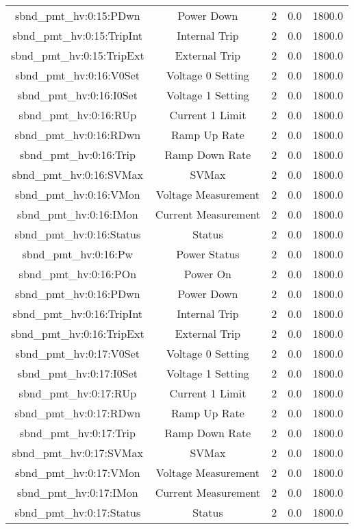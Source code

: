 \begin{table}[ptb]
\begin{tabular}{c | c c c c}
sbnd_pmt_hv:0:15:PDwn & Power Down & 2 & 0.0 & 1800.0\\ 
sbnd_pmt_hv:0:15:TripInt & Internal Trip & 2 & 0.0 & 1800.0\\ 
sbnd_pmt_hv:0:15:TripExt & External Trip & 2 & 0.0 & 1800.0\\ 
sbnd_pmt_hv:0:16:V0Set & Voltage 0 Setting & 2 & 0.0 & 1800.0\\ 
sbnd_pmt_hv:0:16:I0Set & Voltage 1 Setting & 2 & 0.0 & 1800.0\\ 
sbnd_pmt_hv:0:16:RUp & Current 1 Limit & 2 & 0.0 & 1800.0\\ 
sbnd_pmt_hv:0:16:RDwn & Ramp Up Rate & 2 & 0.0 & 1800.0\\ 
sbnd_pmt_hv:0:16:Trip & Ramp Down Rate & 2 & 0.0 & 1800.0\\ 
sbnd_pmt_hv:0:16:SVMax & SVMax & 2 & 0.0 & 1800.0\\ 
sbnd_pmt_hv:0:16:VMon & Voltage Measurement & 2 & 0.0 & 1800.0\\ 
sbnd_pmt_hv:0:16:IMon & Current Measurement & 2 & 0.0 & 1800.0\\ 
sbnd_pmt_hv:0:16:Status & Status & 2 & 0.0 & 1800.0\\ 
sbnd_pmt_hv:0:16:Pw & Power Status & 2 & 0.0 & 1800.0\\ 
sbnd_pmt_hv:0:16:POn & Power On & 2 & 0.0 & 1800.0\\ 
sbnd_pmt_hv:0:16:PDwn & Power Down & 2 & 0.0 & 1800.0\\ 
sbnd_pmt_hv:0:16:TripInt & Internal Trip & 2 & 0.0 & 1800.0\\ 
sbnd_pmt_hv:0:16:TripExt & External Trip & 2 & 0.0 & 1800.0\\ 
sbnd_pmt_hv:0:17:V0Set & Voltage 0 Setting & 2 & 0.0 & 1800.0\\ 
sbnd_pmt_hv:0:17:I0Set & Voltage 1 Setting & 2 & 0.0 & 1800.0\\ 
sbnd_pmt_hv:0:17:RUp & Current 1 Limit & 2 & 0.0 & 1800.0\\ 
sbnd_pmt_hv:0:17:RDwn & Ramp Up Rate & 2 & 0.0 & 1800.0\\ 
sbnd_pmt_hv:0:17:Trip & Ramp Down Rate & 2 & 0.0 & 1800.0\\ 
sbnd_pmt_hv:0:17:SVMax & SVMax & 2 & 0.0 & 1800.0\\ 
sbnd_pmt_hv:0:17:VMon & Voltage Measurement & 2 & 0.0 & 1800.0\\ 
sbnd_pmt_hv:0:17:IMon & Current Measurement & 2 & 0.0 & 1800.0\\ 
sbnd_pmt_hv:0:17:Status & Status & 2 & 0.0 & 1800.0\\ 

\end{tabular}
\end{table}

